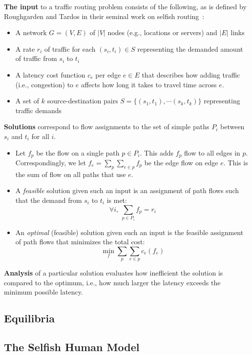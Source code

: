 \documentclass[acmlarge]{acmart}
\begin{document}
\medskip\noindent
\textbf{The input} to a traffic routing problem consists of the following, as is defined by Roughgarden and Tardos in their seminal work on selfish routing~\cite{tardos,roughgarden}:
\begin{itemize}
    \item A network $G = (V, E)$ of $|V|$ nodes (e.g., locations or servers) and $|E|$ links 
    \item A {rate} $r_i$ of traffic for each $(s_i,t_i)\in S$ representing the demanded amount of traffic from $s_i$ to $t_i$
    \item A {latency} cost function $c_e$ per edge $e\in E$ that describes how adding traffic (i.e., congestion) to $e$ affects how long it takes to travel time across $e$.
    \item A set of $k$ source-destination pairs $S=\{(s_1,t_1), \cdots (s_k,t_k)\}$ representing traffic demands
\end{itemize}

\medskip\noindent
\textbf{Solutions} correspond to flow assignments to the set of simple paths $P_i$ between $s_i$ and $t_i$ for all $i$.
\begin{itemize}
    \item Let $f_p$ be the flow on a single path $p \in P_i$. This adds $f_p$ flow to all edges in $p$. Correspondingly, we let $f_e = \sum_p \sum_{e\in p} f_p$ be the edge flow on edge $e$. This is the sum of flow on all paths that use $e$. 
    \item A \emph{feasible} solution given such an input is an assignment of path flows such that the demand from $s_i$ to $t_i$ is met:
$$\forall i,~\sum_{p\in P_i} f_p = r_i$$
    \item An \emph{optimal} (feasible) solution given such an input is the feasible assignment of path flows that minimizes the total cost:
$$\min_{f} \sum_p \sum_{e\in p} c_e(f_e)$$
\end{itemize}

\medskip\noindent
\textbf{Analysis} of a particular solution evaluates how inefficient the solution is compared to the optimum, i.e., how much larger 
the latency exceeds the minimum possible latency.

\subsection{Equilibria}

\subsection{The Selfish Human Model}
\end{document}
